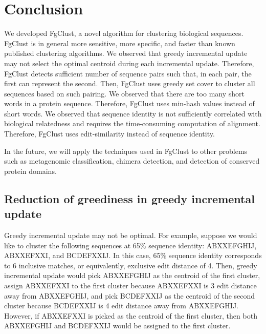 \documentclass[11pt,letterpaper]{article}
\begin{document}
\section{Conclusion}

We developed FgClust, a novel algorithm for clustering biological sequences.
FgClust is in general more sensitive, more specific, and faster than known published clustering algorithms.
We observed that greedy incremental update may not select the optimal centroid during each incremental update.
Therefore, FgClust detects sufficient number of sequence pairs such that, in each pair, the first can represent the second.
Then, FgClust uses greedy set cover to cluster all sequences based on such pairing.
We observed that there are too many short words in a protein sequence.
Therefore, FgClust uses min-hash values instead of short words.
We observed that sequence identity is not sufficiently correlated with biological relatedness and requires the time-consuming computation of alignment.
Therefore, FgClust uses edit-similarity instead of sequence identity.

In the future, we will apply the techniques used in FgClust to other problems such as metagenomic classification, chimera detection, and detection of conserved protein domains.


%


\iffalse

\subsection{Reduction of greediness in greedy incremental update}

Greedy incremental update may not be optimal.
For example, suppose we would like to cluster the following sequences at 65\% sequence identity:
ABXXEFGHIJ, 
ABXXEFXXI, and
BCDEFXXIJ.
In this case, 65\% sequence identity corresponds to 6 inclusive matches, or equivalently, exclusive edit distance of 4.
Then, greedy incremental update would pick ABXXEFGHIJ as the centroid of the first cluster, 
assign ABXXEFXXI to the first cluster because ABXXEFXXI is 3 edit distance away from ABXXEFGHIJ, 
and pick BCDEFXXIJ as the centroid of the second cluster because BCDEFXXIJ is 4 edit distance away from ABXXEFGHIJ.
However, if ABXXEFXXI is picked as the centroid of the first cluster, then both ABXXEFGHIJ and BCDEFXXIJ would be assigned to the first cluster. 
\end{document}

